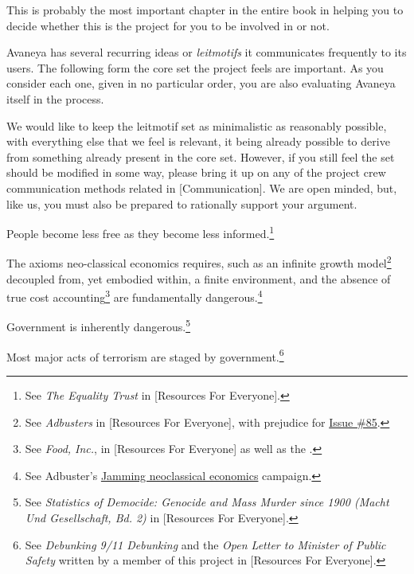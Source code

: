 

This is probably the most important chapter in the entire book in helping you to decide whether this is the project for you to be involved in or not. 

Avaneya has several recurring ideas or {\it leitmotifs} it communicates frequently to its users. The following form the core set the project feels are important. As you consider each one, given in no particular order, you are also evaluating Avaneya itself in the process.

We would like to keep the leitmotif set as minimalistic as reasonably possible, with everything else that we feel is relevant, it being already possible to derive from something already present in the core set. However, if you still feel the set should be modified in some way, please bring it up on any of the project crew communication methods related in [Communication]. We are open minded, but, like us, you must also be prepared to rationally support your argument.

\startitemize[R]
\setupwhitespace[big]
\item
People become less free as they become less informed.\footnote{See {\it The Equality Trust} in [Resources For Everyone].}

\item
The axioms neo-classical economics requires, such as an infinite growth model\footnote{See {\it Adbusters} in [Resources For Everyone], with prejudice for \href{http://www.adbusters.org/cultureshop/backissues/85}{Issue \#85}.} decoupled from, yet embodied within, a finite environment, and the absence of true cost accounting\footnote{See {\it Food, Inc.}, in [Resources For Everyone] as well as the .} are fundamentally dangerous.\footnote{See Adbuster's \href{http://anticap.wordpress.com/2010/10/25/jamming-neoclassical-economics/}{Jamming neoclassical economics} campaign.}

\item
Government is inherently dangerous.\footnote{See {\it Statistics of Democide: Genocide and Mass Murder since 1900 (Macht Und Gesellschaft, Bd. 2)} in [Resources For Everyone].}

\item
Most major acts of terrorism are staged by government.\footnote{See {\it Debunking 9/11 Debunking} and the {\it Open Letter to Minister of Public Safety} written by a member of this project in [Resources For Everyone].}

